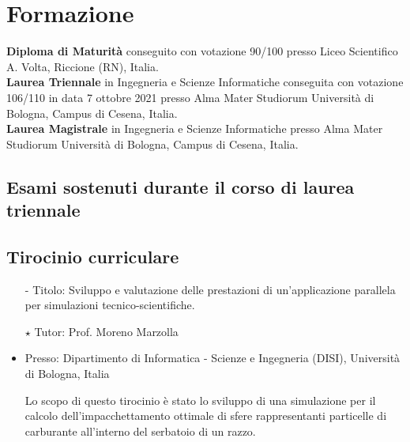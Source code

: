 \documentclass[curriculum-vitae]{subfiles}
\begin{document}
	\section*{Formazione}
		 \textbf{Diploma di Maturità} conseguito con votazione 90/100 presso Liceo Scientifico A. Volta, Riccione (RN), Italia.\\
		
		 \textbf{Laurea Triennale} in Ingegneria e Scienze Informatiche conseguita con votazione 106/110 in data 7 ottobre 2021 presso Alma Mater Studiorum Università di Bologna, Campus di Cesena, Italia.\\
		
		 \textbf{Laurea Magistrale} in Ingegneria e Scienze Informatiche presso Alma Mater Studiorum Università di Bologna, Campus di Cesena, Italia.
		
		\subsection*{Esami sostenuti durante il corso di laurea triennale}
			\begin{minipage}[t]{.47\textwidth}
			\end{minipage}
			\hfill
			\begin{minipage}[t]{.47\textwidth}
			\end{minipage}
		
		\subsection*{Tirocinio curriculare}
			\begin{itemize}
				\item[-] {\large Titolo:} Sviluppo e valutazione delle prestazioni di un'applicazione parallela per simulazioni tecnico-scientifiche.
				\item[$\star$] {\large Tutor:} Prof. Moreno Marzolla
				\item {\large Presso:} Dipartimento di Informatica - Scienze e Ingegneria (DISI), Università di Bologna, Italia
				\item[] Lo scopo di questo tirocinio è stato lo sviluppo di una simulazione per il calcolo dell'impacchettamento ottimale di sfere rappresentanti particelle di carburante all'interno del serbatoio di un razzo.
			\end{itemize}
		
\end{document}
